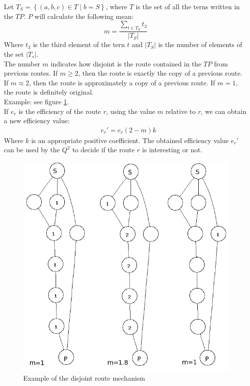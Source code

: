 \documentclass[a4paper]{article}
\newcommand{\pgra}[1]{\left\{#1\right\}}
\newcommand{\eal}[1]{{\begin{align*} #1 \end{align*}}}
\begin{document}
Let $T_S=\pgra{(a,b,c) \in T \;|\;b=S}$, where $T$ is the set of all the terns
written in the $TP$. $P$ will calculate the following mean:
\[
m=\frac{\sum_{t \in T_S}^{}t_3}{|T_S|}
\]
Where $t_3$ is the third element of the tern $t$ and $|T_S|$ is the number of elements
of the set $|T_s|$.\\ 

The number $m$ indicates how disjoint is the route contained in the $TP$ from
previous routes. If $m\ge 2$, then the route is exactly the copy of a previous
route. If $m\approx 2$, then the route is approximately a copy of a previous
route. If $m=1$, the route is definitely original.\\
Example: see figure \ref{fig:disjroute}.\\
If $e_r$ is the efficiency of the route $r$, using the value $m$ relative to
$r$, we can obtain a new efficiency value:
\eal{&e_r'=e_r(2-m)k}
Where $k$ is an appropriate positive coefficient. 
The obtained efficiency value $e_r'$ can be used by the $Q^2$ to
decide if the route $r$ is interesting or not.

\begin{figure}[h]
	\begin{center}
		\includegraphics[scale=0.35]{fig/disjrouteU}
	\end{center}
	\caption{Example of the disjoint route mechanism}
	\label{fig:disjroute}
\end{figure}
\pagebreak
\end{document}
